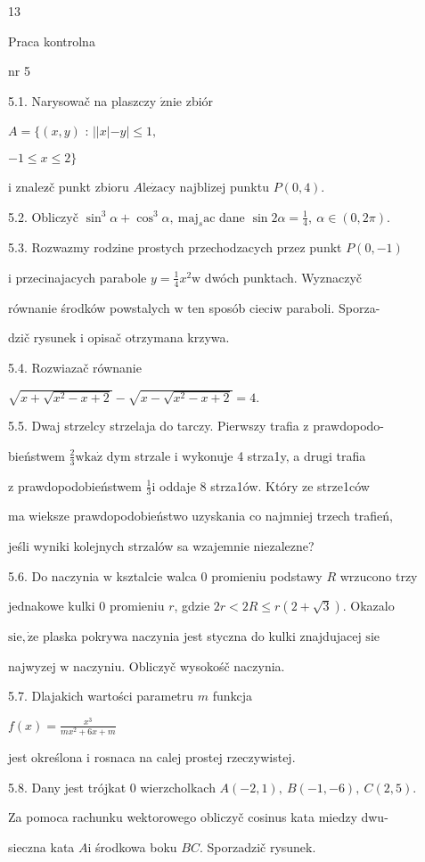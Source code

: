 \documentclass[a4paper,12pt]{article}
\begin{document}
13

Praca kontrolna

nr 5

5.1. Narysowač na plaszczy $\acute{\mathrm{z}}\mathrm{n}\mathrm{i}\mathrm{e}$ zbiór

$A=\{(x,y)$ : $||x|-y|\leq 1,$

$-1\leq x\leq 2\}$

$\mathrm{i}$ znalez$\acute{}$č punkt zbioru $A\mathrm{l}\mathrm{e}\dot{\mathrm{z}}\mathrm{a}\mathrm{c}\mathrm{y}$ najblizej punktu $P(0,4).$

5.2. Obliczyč $\sin^{3}\alpha+\cos^{3}\alpha,\ \mathrm{m}\mathrm{a}\mathrm{j}_{s}\mathrm{a}\mathrm{c}$ dane $\displaystyle \sin 2\alpha=\frac{1}{4},\ \alpha\in(0,2\pi)$.

5.3. Rozwazmy rodzine prostych przechodzacych przez punkt $P(0,-1)$

$\mathrm{i}$ przecinajacych parabole $y = \displaystyle \frac{1}{4}x^{2} \mathrm{w}$ dwóch punktach. Wyznaczyč

równanie środków powstalych $\mathrm{w}$ ten sposób cieciw paraboli. Sporza-

dzič rysunek $\mathrm{i}$ opisač otrzymana krzywa.

5.4. Rozwiazač równanie

$\sqrt{x+\sqrt{x^{2}-x+2}}-\sqrt{x-\sqrt{x^{2}-x+2}}=4.$

5.5. Dwaj strzelcy strzelaja do tarczy. Pierwszy trafia $\mathrm{z}$ prawdopodo-

bieństwem $\displaystyle \frac{2}{3} \mathrm{w} \mathrm{k}\mathrm{a}\dot{\mathrm{z}}$ dym strzale $\mathrm{i}$ wykonuje 4 strza1y, a drugi trafia

$\mathrm{z}$ prawdopodobieństwem $\displaystyle \frac{1}{3} \mathrm{i}$ oddaje 8 strza1ów. Który ze strze1ców

ma wieksze prawdopodobieństwo uzyskania co najmniej trzech trafień,

jeśli wyniki kolejnych strzalów sa wzajemnie niezalezne?

5.6. Do naczynia $\mathrm{w}$ ksztalcie walca $0$ promieniu podstawy $R$ wrzucono trzy

jednakowe kulki $0$ promieniu $r$, gdzie $2r<2R\leq r(2+\sqrt{3})$. Okazalo

$\mathrm{s}\mathrm{i}\mathrm{e}, \dot{\mathrm{z}}\mathrm{e}$ plaska pokrywa naczynia jest styczna do kulki znajdujacej $\mathrm{s}\mathrm{i}\mathrm{e}$

najwyzej $\mathrm{w}$ naczyniu. Obliczyč wysokośč naczynia.

5.7. Dlajakich wartości parametru $m$ funkcja

$f(x)=\displaystyle \frac{x^{3}}{mx^{2}+6x+m}$

jest określona $\mathrm{i}$ rosnaca na calej prostej rzeczywistej.

5.8. Dany jest trójkat $0$ wierzcholkach $A(-2,1),\ B(-1,-6),\ C(2,5)$.

Za pomoca rachunku wektorowego obliczyč cosinus kata miedzy dwu-

sieczna kata $A\mathrm{i}$ środkowa boku $BC$. Sporzadzič rysunek.
\end{document}
